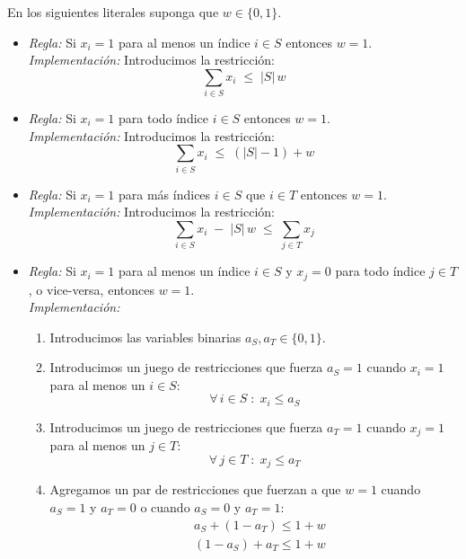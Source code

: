 \documentclass[ 10pt, xcolor = dvipsnames]{beamer}
\begin{document}
\begin{frame}[allowframebreaks]
\frametitle{\insertsection}

En los siguientes literales suponga que $w \in \{ 0, 1 \}$. 
\begin{itemize}
\item \emph{Regla:} Si $x_i = 1$ para al menos un \'indice $i \in S$ entonces $w = 1$. \\[1ex] \emph{Implementaci\'on:} Introducimos la restricci\'on: 
\[
\sum_{i \in S} x_i \; \leq \; |S| \, w
\]
\item \emph{Regla:} Si $x_i = 1$ para todo \'indice $i \in S$ entonces $w = 1$. \\[1ex] \emph{Implementaci\'on:} Introducimos la restricci\'on: 
\[
\sum_{i \in S} x_i \; \leq \; (|S|-1) + w
\]
\end{itemize}
\framebreak

\begin{itemize}
\item \emph{Regla:} Si $x_i = 1$ para m\'as \'indices $i \in S$ que $i \in T$ entonces $w = 1$. \\[1ex] \emph{Implementaci\'on:} Introducimos la restricci\'on: 
\[
\sum_{i \in S} x_i \; - \; |S| \, w \; \leq \; \sum_{j \in T} x_j
\]
\item \emph{Regla:} Si $x_i = 1$ para al menos un \'indice $i \in S$ y $x_j = 0$ para todo \'indice $j \in T$, o vice-versa, entonces $w = 1$. \\[1ex] \emph{Implementaci\'on:}
\begin{enumerate}
\item Introducimos las variables binarias $a_S, a_T \in \{ 0, 1 \}$. 
\item Introducimos un juego de restricciones que fuerza $a_S = 1$ cuando $x_i = 1$ \linebreak para al menos un $i \in S$: 
\[
\forall \, i \in S \; \colon \; x_i \leq a_S
\]
\framebreak
\item Introducimos un juego de restricciones que fuerza $a_T = 1$ cuando $x_j = 1$ \linebreak para al menos un $j \in T$: 
\[
\forall \, j \in T \; \colon \; x_j \leq a_T
\]
\item Agregamos un par de restricciones que fuerzan a que $w = 1$ cuando $a_S = 1$ y $a_T = 0$ o cuando $a_S = 0$ y $a_T = 1$: 
\begin{align*}
& a_S + ( 1 - a_T ) \leq 1 + w \\
& ( 1 - a_S ) + a_T \leq 1 + w
\end{align*}

\end{enumerate}
\end{itemize}
\framebreak

\end{frame}
\end{document}
